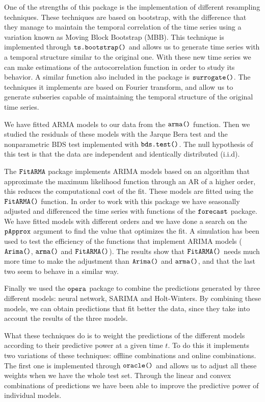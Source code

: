 \documentclass[12pt,a4paper,oneside]{article}
\begin{document}
One of the strengths of this package is the implementation of different resampling techniques. These techniques are based on bootstrap, with the difference that they manage to maintain the temporal correlation of the time series using a variation known as Moving Block Bootstrap (MBB). This technique is implemented through $\verb!ts.bootstrap()!$ and allows us to generate time series with a temporal structure similar to the original one. With these new time series we can make estimations of the autocorrelation function in order to study its behavior. A similar function also included in the package is $\verb!surrogate()!$. The techniques it implements are based on Fourier transform, and allow us to generate subseries capable of maintaining the temporal structure of the original time series.

We have fitted ARMA models to our data from the $\verb!arma()!$ function. Then we studied the residuals of these models with the Jarque Bera test and the nonparametric BDS test implemented with $\verb!bds.test()!$. The null hypothesis of this test is that the data are independent and identically distributed (i.i.d).

The $\verb!FitARMA!$ package implements ARIMA models based on an algorithm that approximate the maximum likelihood function through an AR of a higher order, this reduces the computational cost of the fit. These models are fitted using the $\verb!FitARMA()!$ function. In order to work with this package we have seasonally adjusted and differenced the time series with functions of the $\verb!forecast!$ package. We have fitted models with different orders and we have done a search on the $\verb!pApprox!$ argument to find the value that optimizes the fit. A simulation has been used to test the efficiency of the functions that implement ARIMA models ($\verb!Arima()!$, $\verb!arma()!$ and $\verb!FitARMA()!$). The results show that $\verb!FitARMA()!$ needs much more time to make the adjustment than $\verb!Arima()!$ and $\verb!arma()!$, and that the last two seem to behave in a similar way.

Finally we used the $\verb!opera!$ package to combine the predictions generated by three different models: neural network, SARIMA and Holt-Winters. By combining these models, we can obtain predictions that fit better the data, since they take into account the results of the three models.

What these techniques do is to weight the predictions of the different models according to their predictive power at a given time $t$. To do this it implements two variations of these techniques: offline combinations and online combinations. The first one is implemented through $\verb!oracle()!$ and allows us to adjust all these weights when we have the whole test set. Through the linear and convex combinations of predictions we have been able to improve the predictive power of individual models.
\end{document}
